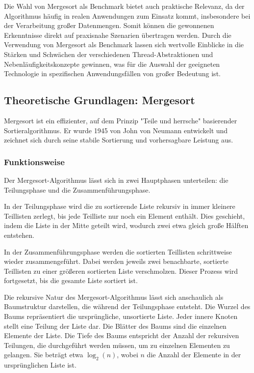 \documentclass[fontsize=12pt,paper=a4,twoside=semi,parskip=half-,headsepline,headinclude]{scrreprt}
\begin{document}
Die Wahl von Mergesort als Benchmark bietet auch praktische Relevanz, da der Algorithmus häufig in realen Anwendungen zum Einsatz kommt, insbesondere bei der Verarbeitung großer Datenmengen. Somit können die gewonnenen Erkenntnisse direkt auf praxisnahe Szenarien übertragen werden. Durch die Verwendung von Mergesort als Benchmark lassen sich wertvolle Einblicke in die Stärken und Schwächen der verschiedenen Thread-Abstraktionen und Nebenläufigkeitskonzepte gewinnen, was für die Auswahl der geeigneten Technologie in spezifischen Anwendungsfällen von großer Bedeutung ist.

\subsection{Theoretische Grundlagen: Mergesort}

Mergesort ist ein effizienter, auf dem Prinzip "Teile und herrsche" basierender Sortieralgorithmus. Er wurde 1945 von John von Neumann entwickelt und zeichnet sich durch seine stabile Sortierung und vorhersagbare Leistung aus.

\subsubsection{Funktionsweise}

Der Mergesort-Algorithmus lässt sich in zwei Hauptphasen unterteilen: die Teilungsphase und die Zusammenführungsphase.

In der Teilungsphase wird die zu sortierende Liste rekursiv in immer kleinere Teillisten zerlegt, bis jede Teilliste nur noch ein Element enthält. Dies geschieht, indem die Liste in der Mitte geteilt wird, wodurch zwei etwa gleich große Hälften entstehen.

In der Zusammenführungsphase werden die sortierten Teillisten schrittweise wieder zusammengeführt. Dabei werden jeweils zwei benachbarte, sortierte Teillisten zu einer größeren sortierten Liste verschmolzen. Dieser Prozess wird fortgesetzt, bis die gesamte Liste sortiert ist.

Die rekursive Natur des Mergesort-Algorithmus lässt sich anschaulich als Baumstruktur darstellen, die während der Teilungsphase entsteht. Die Wurzel des Baums repräsentiert die ursprüngliche, unsortierte Liste. Jeder innere Knoten stellt eine Teilung der Liste dar. Die Blätter des Baums sind die einzelnen Elemente der Liste. Die Tiefe des Baums entspricht der Anzahl der rekursiven Teilungen, die durchgeführt werden müssen, um zu einzelnen Elementen zu gelangen. Sie beträgt etwa $\log_2(n)$, wobei $n$ die Anzahl der Elemente in der ursprünglichen Liste ist.
\end{document}

